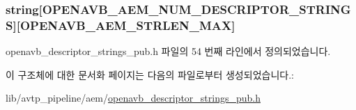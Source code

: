 \subsubsection[{\texorpdfstring{string}{string}}]{ string\mbox{[}{\bf O\+P\+E\+N\+A\+V\+B\+\_\+\+A\+E\+M\+\_\+\+N\+U\+M\+\_\+\+D\+E\+S\+C\+R\+I\+P\+T\+O\+R\+\_\+\+S\+T\+R\+I\+N\+GS}\mbox{]}\mbox{[}{\bf O\+P\+E\+N\+A\+V\+B\+\_\+\+A\+E\+M\+\_\+\+S\+T\+R\+L\+E\+N\+\_\+\+M\+AX}\mbox{]}}\hypertarget{structopenavb__aem__descriptor__strings__t_a4d5751a6bc93c78ad863055af5f05e7c}{}\label{structopenavb__aem__descriptor__strings__t_a4d5751a6bc93c78ad863055af5f05e7c}


openavb\+\_\+descriptor\+\_\+strings\+\_\+pub.\+h 파일의 54 번째 라인에서 정의되었습니다.



이 구조체에 대한 문서화 페이지는 다음의 파일로부터 생성되었습니다.\+:\begin{DoxyCompactItemize}
\item 
lib/avtp\+\_\+pipeline/aem/\hyperlink{openavb__descriptor__strings__pub_8h}{openavb\+\_\+descriptor\+\_\+strings\+\_\+pub.\+h}\end{DoxyCompactItemize}
